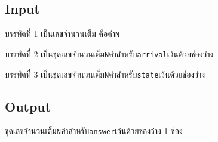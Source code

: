 \documentclass{article}
\begin{document}
\subsection*{Input}
บรรทัดที่ 1 เป็นเลขจำนวนเต็ม คือค่า\texttt{N}



บรรทัดที่ 2 เป็นชุดเลขจำนวนเต็ม\texttt{N}ค่าสำหรับ\texttt{arrival}เว้นด้วยช่องว่าง



บรรทัดที่ 3 เป็นชุดเลขจำนวนเต็ม\texttt{N}ค่าสำหรับ\texttt{state}เว้นด้วยช่องว่าง



\subsection*{Output}
ชุดเลขจำนวนเต็ม\texttt{N}ค่าสำหรับ\texttt{answer}เว้นด้วยช่องว่าง 1 ช่อง\\
\end{document}
